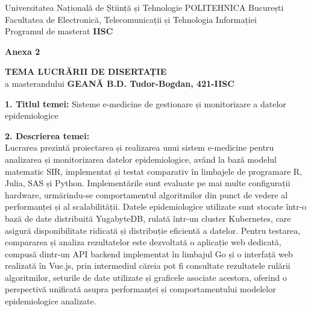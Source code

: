\cleardoublepage   %
\thispagestyle{empty}
{\setlength{\parindent}{0pt}\setlength{\parskip}{5pt}\footnotesize

\noindent
\begin{minipage}[t]{0.7\textwidth}
Universitatea Națională de Știință și Tehnologie POLITEHNICA București\\
Facultatea de Electronică, Telecomunicații și Tehnologia Informației\\
Programul de masterat \textbf{IISC}
\end{minipage}\hfill
\begin{minipage}[t]{0.25\textwidth}
\raggedleft\textbf{Anexa 2}
\end{minipage}

\vspace{1em}

\begin{center}
\textbf{TEMA LUCRĂRII DE DISERTAȚIE}\\[0.3em]
a masterandului \textbf{GEANĂ B.D. Tudor-Bogdan, 421-IISC}
\end{center}

\vspace{0.3em}

\textbf{1. Titlul temei:} Sisteme e-medicine de gestionare și monitorizare a
datelor epidemiologice

\textbf{2. Descrierea temei:}\\
Lucrarea prezintă proiectarea și realizarea unui sistem e-medicine pentru
analizarea și monitorizarea datelor epidemiologice, având la bază modelul
matematic SIR, implementat și testat comparativ în limbajele de programare R,
Julia, SAS și Python. Implementările sunt evaluate pe mai multe configurații
hardware, urmărindu-se comportamentul algoritmilor din punct de vedere al
performanței și al scalabilității. Datele epidemiologice utilizate sunt stocate
într-o bază de date distribuită YugabyteDB, rulată într-un cluster Kubernetes,
care asigură disponibilitate ridicată și distribuție eficientă a datelor. Pentru
testarea, compararea și analiza rezultatelor este dezvoltată o aplicație web
dedicată, compusă dintr-un API backend implementat în limbajul Go și o interfață
web realizată în Vue.js, prin intermediul căreia pot fi consultate rezultatele
rulării algoritmilor, seturile de date utilizate și graficele asociate acestora,
oferind o perspectivă unificată asupra performanței și comportamentului modelelor
epidemiologice analizate.

}
